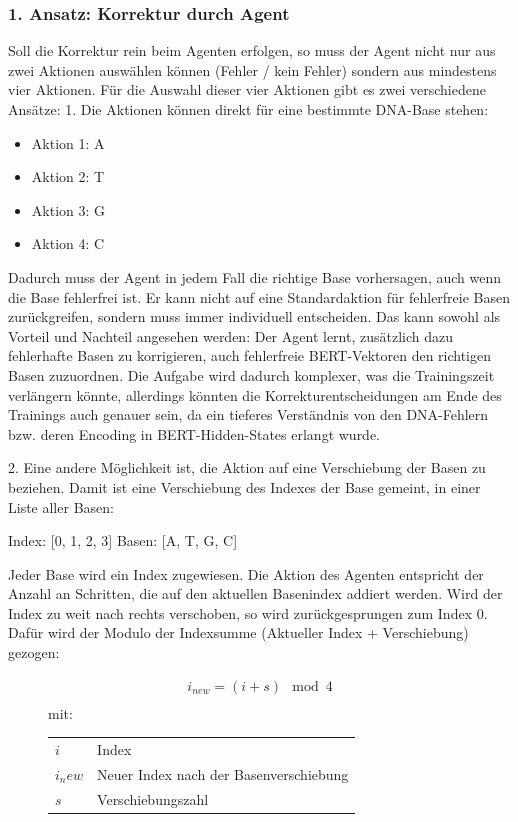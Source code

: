\documentclass[oneside,bibliography=totocnumbered,BCOR=5mm]{scrbook}%
\makeatletter
\theoremstyle{definition}
\theoremstyle{definition}
\theoremstyle{definition}
\theoremstyle{definition}
\theoremstyle{definition}
\theoremstyle{definition}
\newenvironment{conditions}[1][mit:]
  {#1 \begin{tabular}[t]{>{$}l<{$} @{${}={}$} l}}
  {\end{tabular}\\[\belowdisplayskip]}
\makeatother
\begin{document}
\subsubsection{1. Ansatz: Korrektur durch Agent}
Soll die Korrektur rein beim Agenten erfolgen, so muss der Agent nicht nur aus zwei Aktionen 
auswählen können (Fehler / kein Fehler) sondern aus mindestens vier Aktionen. 
Für die Auswahl dieser vier Aktionen gibt es zwei verschiedene Ansätze:
1. Die Aktionen können direkt für eine bestimmte DNA-Base stehen:

\begin{itemize}
  \item Aktion 1: A
  \item Aktion 2: T
  \item Aktion 3: G
  \item Aktion 4: C
\end{itemize}

Dadurch muss der Agent in jedem Fall die richtige Base vorhersagen, auch wenn die Base fehlerfrei ist.
Er kann nicht auf eine Standardaktion für fehlerfreie Basen zurückgreifen, sondern muss immer individuell entscheiden.
Das kann sowohl als Vorteil und Nachteil angesehen werden: 
Der Agent lernt, zusätzlich dazu fehlerhafte Basen zu korrigieren,
auch fehlerfreie BERT-Vektoren den richtigen Basen zuzuordnen.
Die Aufgabe wird dadurch komplexer, was die Trainingszeit verlängern könnte, allerdings könnten die Korrekturentscheidungen
am Ende des Trainings auch genauer sein, da ein tieferes Verständnis von den DNA-Fehlern bzw. deren Encoding in BERT-Hidden-States erlangt wurde.

2. Eine andere Möglichkeit ist, die Aktion auf eine Verschiebung der Basen zu beziehen. 
Damit ist eine Verschiebung des Indexes der Base gemeint, in einer Liste aller Basen:

Index: [0, 1, 2, 3]
Basen: [A, T, G, C]

Jeder Base wird ein Index zugewiesen. Die Aktion des Agenten entspricht der Anzahl an Schritten, die auf den aktuellen Basenindex
addiert werden. Wird der Index zu weit nach rechts verschoben, so wird zurückgesprungen zum Index 0. 
Dafür wird der Modulo der Indexsumme (Aktueller Index + Verschiebung) gezogen:\\

\begin{figure}
\begin{align*}
i_{new} = (i + s)\mod 4\\
\end{align*}
\begin{conditions}
  i      & Index \\
  i_new  & Neuer Index nach der Basenverschiebung \\
  s      & Verschiebungszahl \\
\end{conditions}
\end{figure}
\end{document}
